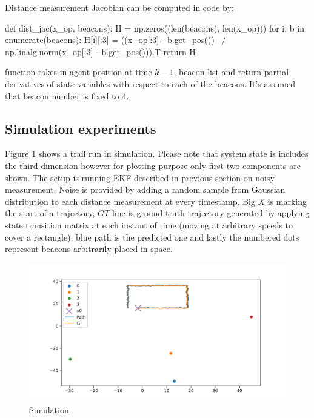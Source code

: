 Distance measurement Jacobian can be computed in code by:
\begin{python}
def dist_jac(x_op, beacons):
    H = np.zeros((len(beacons), len(x_op)))
    for i, b in enumerate(beacons):
        H[i][:3] = ((x_op[:3] - b.get_pos()) \
            / np.linalg.norm(x_op[:3] - b.get_pos())).T
    return H
\end{python}
function takes in agent position at time $k-1$, beacon list and return partial derivatives of state variables with respect to each of the beacons. It's assumed that beacon number is fixed to 4.

\subsection{Simulation experiments}

Figure \ref{fig:sim} shows a trail run in simulation. Please note that system state is includes the third dimension however for plotting purpose only first two components are shown. The setup is running EKF described in previous section on noisy measurement. Noise is provided by adding a random sample from Gaussian distribution to each distance measurement at every timestamp. Big $X$ is marking the start of a trajectory, $GT$ line is ground truth trajectory generated by applying state transition matrix at each instant of time (moving at arbitrary speeds to cover a rectangle), blue path is the predicted one and lastly the numbered dots represent beacons arbitrarily placed in space.
\begin{figure}
    \includegraphics[width=\linewidth]{figures/sim.png}
    \caption{Simulation}
    \label{fig:sim}
\end{figure}

